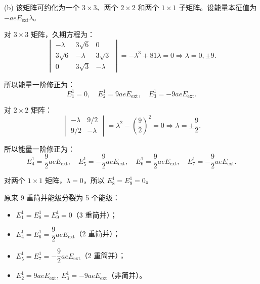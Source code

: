 (b) 该矩阵可约化为一个 $3\times3$、两个 $2\times2$ 和两个 $1\times1$ 子矩阵。设能量本征值为 $-a e E_{\mathrm{ext}} \lambda$。

对 $3\times3$ 矩阵，久期方程为：
\[
\begin{vmatrix}
	-\lambda & 3\sqrt{6} & 0 \\
	3\sqrt{6} & -\lambda & 3\sqrt{3} \\
	0 & 3\sqrt{3} & -\lambda
\end{vmatrix}
= -\lambda^3 + 81\lambda = 0 \Rightarrow \lambda = 0, \pm 9.
\]

所以能量一阶修正为：
\[
E_1^1 = 0, \quad E_2^1 = 9ae E_{\mathrm{ext}}, \quad E_3^1 = -9ae E_{\mathrm{ext}}.
\]

对 $2\times2$ 矩阵：
\[
\begin{vmatrix}
	-\lambda & 9/2 \\
	9/2 & -\lambda
\end{vmatrix}
= \lambda^2 - \left(\frac{9}{2}\right)^2 = 0 \Rightarrow \lambda = \pm \frac{9}{2}.
\]

所以能量一阶修正为：
\[
E_4^1 = \frac{9}{2}ae E_{\mathrm{ext}}, \quad E_5^1 = -\frac{9}{2}ae E_{\mathrm{ext}}, \quad E_6^1 = \frac{9}{2}ae E_{\mathrm{ext}}, \quad E_7^1 = -\frac{9}{2}ae E_{\mathrm{ext}}.
\]

对两个 $1\times1$ 矩阵，$\lambda = 0$，所以 $E_8^1 = E_9^1 = 0$。

原来 9 重简并能级分裂为 5 个能级：
\begin{itemize}
	\item $E_1^1 = E_8^1 = E_9^1 = 0$（3 重简并）；
	\item $E_4^1 = E_6^1 = \dfrac{9}{2}ae E_{\mathrm{ext}}$（2 重简并）；
	\item $E_5^1 = E_7^1 = -\dfrac{9}{2}ae E_{\mathrm{ext}}$（2 重简并）；
	\item $E_2^1 = 9ae E_{\mathrm{ext}},\ E_3^1 = -9ae E_{\mathrm{ext}}$（非简并）。
\end{itemize}